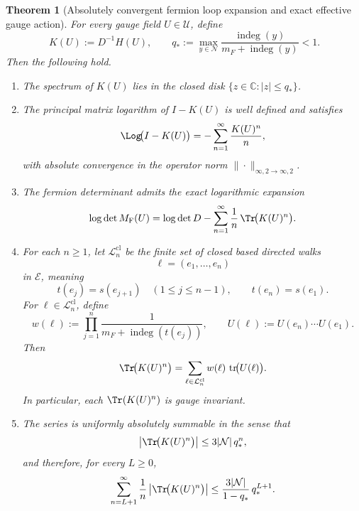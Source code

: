 \documentclass[11pt]{article}
\newtheorem{theorem}{Theorem}[section]
\theoremstyle{remark}
\newcommand{\C}{\mathbb C}
\newcommand{\mcN}{\mathcal N}
\newcommand{\mcE}{\mathcal E}
\newcommand{\mcU}{\mathscr U}
\newcommand{\tr}{\operatorname{tr}}
\newcommand{\indeg}{\operatorname{indeg}}
\begin{document}
\begin{theorem}[Absolutely convergent fermion loop expansion and exact effective gauge action]
\label{thm:fermion-loop-expansion}
For every gauge field \(U\in\mcU\), define
\[
K(U):=D^{-1}H(U),
\qquad
q_*:=\max_{y\in\mcN}\frac{\indeg(y)}{m_F+\indeg(y)}<1.
\]
Then the following hold.
\begin{enumerate}[leftmargin=1.5em]
\item The spectrum of \(K(U)\) lies in the closed disk \(\{z\in\C:|z|\le q_*\}\).
\item The principal matrix logarithm of \(I-K(U)\) is well defined and satisfies
\[
\Log\!\bigl(I-K(U)\bigr)
=
-\sum_{n=1}^\infty \frac{K(U)^n}{n},
\]
with absolute convergence in the operator norm
\(\|\cdot\|_{\infty,2\to\infty,2}\).
\item The fermion determinant admits the exact logarithmic expansion
\[
\log\det M_{\mathrm F}(U)
=
\log\det D
-\sum_{n=1}^\infty \frac1n\,\Tr\!\bigl(K(U)^n\bigr).
\]
\item For each \(n\ge1\), let \(\mathcal L_n^{\mathrm{cl}}\) be the finite set
of closed based directed walks
\[
\ell=(e_1,\dots,e_n)
\]
in \(\mcE\), meaning
\[
t(e_j)=s(e_{j+1})\quad(1\le j\le n-1),
\qquad
t(e_n)=s(e_1).
\]
For \(\ell\in\mathcal L_n^{\mathrm{cl}}\), define
\[
w(\ell):=\prod_{j=1}^n \frac{1}{m_F+\indeg(t(e_j))},
\qquad
U(\ell):=U(e_n)\cdots U(e_1).
\]
Then
\[
\Tr\!\bigl(K(U)^n\bigr)
=
\sum_{\ell\in\mathcal L_n^{\mathrm{cl}}}
w(\ell)\,\tr\!\bigl(U(\ell)\bigr).
\]
In particular, each \(\Tr(K(U)^n)\) is gauge invariant.
\item The series is uniformly absolutely summable in the sense that
\[
\left|\Tr\!\bigl(K(U)^n\bigr)\right|
\le
3|\mcN|\,q_*^n,
\]
and therefore, for every \(L\ge0\),
\[
\sum_{n=L+1}^\infty \frac1n
\left|\Tr\!\bigl(K(U)^n\bigr)\right|
\le
\frac{3|\mcN|}{1-q_*}\,q_*^{L+1}.
\]
\end{enumerate}
\end{theorem}
\end{document}
